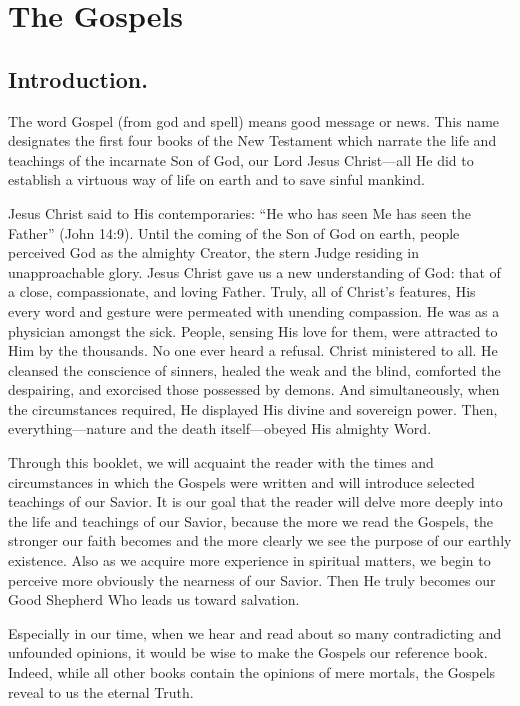 \chapter{The Gospels}\label{ch:the-gospels}

\section{Introduction.}

The word Gospel (from god and spell) means good message or news. This name designates the first four books of the New Testament which narrate the life and teachings of the incarnate Son of God, our Lord Jesus Christ---all He did to establish a virtuous way of life on earth and to save sinful mankind.

Jesus Christ said to His contemporaries: ``He who has seen Me has seen the Father'' (John 14:9). Until the coming of the Son of God on earth, people perceived God as the almighty Creator, the stern Judge residing in unapproachable glory. Jesus Christ gave us a new understanding of God: that of a close, compassionate, and loving Father. Truly, all of Christ's features, His every word and gesture were permeated with unending compassion. He was as a physician amongst the sick. People, sensing His love for them, were attracted to Him by the thousands. No one ever heard a refusal. Christ ministered to all. He cleansed the conscience of sinners, healed the weak and the blind, comforted the despairing, and exorcised those possessed by demons. And simultaneously, when the circumstances required, He displayed His divine and sovereign power. Then, everything---nature and the death itself---obeyed His almighty Word.

Through this booklet, we will acquaint the reader with the times and circumstances in which the Gospels were written and will introduce selected teachings of our Savior. It is our goal that the reader will delve more deeply into the life and teachings of our Savior, because the more we read the Gospels, the stronger our faith becomes and the more clearly we see the purpose of our earthly existence. Also as we acquire more experience in spiritual matters, we begin to perceive more obviously the nearness of our Savior. Then He truly becomes our Good Shepherd Who leads us toward salvation.

Especially in our time, when we hear and read about so many contradicting and unfounded opinions, it would be wise to make the Gospels our reference book. Indeed, while all other books contain the opinions of mere mortals, the Gospels reveal to us the eternal Truth.

